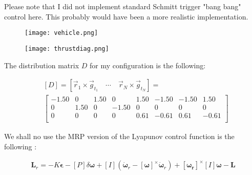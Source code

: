 \documentclass[conf]{new-aiaa}
\begin{document}
\begin{singlespace}
Please note that I did not implement standard Schmitt trigger "bang bang" control here. This probably would have been a more realistic implementation.

\begin{figure}[!htbp] 
\centering
\begin{minipage}{.5\textwidth}
  \centering
  \texttt{[image: vehicle.png]}
  \label{fig:vehicle}
\end{minipage}%
\begin{minipage}{.5\textwidth}
  \centering
  \texttt{[image: thrustdiag.png]}
  \label{fig:thrusters}
\end{minipage}
\end{figure}


The distribution matrix $D$ for my configuration is the following:

\begin{align*}
& \left[D \right] = \left[\vec{r}_1 \times \vec{g}_{t_1} \quad \cdots \quad \vec{r}_N\times \vec{g}_{t_N}\right]  = \\
&\begin{bmatrix}
   -1.50   &      0   & 1.50  &       0  &  1.50  & -1.50 &  -1.50  &  1.50 \\
         0   & 1.50   &      0  & -1.50  &       0  &       0 &        0  &       0 \\
         0   &      0   &      0  &       0  &  0.61  & -0.61 &   0.61  & -0.61 \\
\end{bmatrix}
\end{align*}

We shall no use the MRP version of the Lyapunov control function is the following \cite{schaub}:

\begin{align}
\mathbf{L}_r = -K\mathbf{\epsilon} - \left[P\right]\delta\mathbf{\omega} +
\left[I\right](\dot{\mathbf{\omega}}_r - \left[\mathbf{\omega}\right]^{\times}\dot{\mathbf{\omega}}_r) + \left[\mathbf{\omega_r}\right]^{\times}\left[I\right]\mathbf{\omega} - \mathbf{L}
\end{align}


\end{singlespace}
\end{document}

